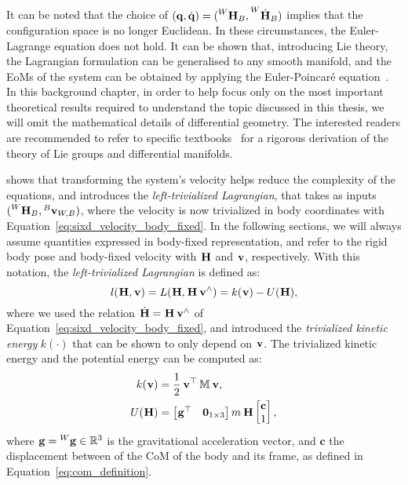 \begin{remark*}
%
It can be noted that the choice of $(\Qu, \Qud) = (\homo[W]_B, \homod[W]_B)$ implies that the configuration space is no longer Euclidean.
In these circumstances, the Euler-Lagrange equation does not hold.
It can be shown that, introducing Lie theory, the Lagrangian formulation can be generalised to any smooth manifold, and the \acp{EoM} of the system can be obtained by applying the Euler-Poincaré equation~\parencite{marsden_jerrold_e_introduction_2010, maruskin_dynamical_2018}.
In this background chapter, in order to help focus only on the most important theoretical results required to understand the topic discussed in this thesis, we will omit the mathematical details of differential geometry.
The interested readers are recommended to refer to specific textbooks~\parencite{warner_foundations_1983, selig_geometric_2005} for a rigorous derivation of the theory of Lie groups and differential manifolds.
%
\end{remark*}
%
\textcite{traversaro_modelling_2017} shows that transforming the system's velocity helps reduce the complexity of the equations, and introduces the \emph{left-trivialized Lagrangian}, that takes as inputs $(\homo[W]_B, \velsix[B]_{W,B})$, where the velocity is now trivialized in body coordinates with Equation~\eqref{eq:sixd_velocity_body_fixed}.
In the following sections, we will always assume quantities expressed in body-fixed representation, and refer to the rigid body pose and body-fixed velocity with $\homo$ and $\velsix$, respectively.
With this notation, the \emph{left-trivialized Lagrangian} is defined as:
%
\begin{equation}
    \label{eq:left_trivialized_lagrangian}
    l(\homo, \velsix) = L(\homo, \homo \velsix^\wedge) = k(\velsix) - U(\homo)
    ,
\end{equation}
%
where we used the relation $\homod = \homo \velsix^\wedge$ of Equation~\eqref{eq:sixd_velocity_body_fixed}, and introduced the \emph{trivialized kinetic energy} $k(\cdot)$ that can be shown to only depend on $\velsix$.
The trivialized kinetic energy and the potential energy can be computed as:
%
\begin{align}
    \label{eq:kinetic_and_potential_energies}
    k(\velsix) &= \frac{1}{2} \velsix^\top \masssix \velsix , \\
    U(\homo) &=
    \begin{bmatrix}\gravity^\top & \zeros_{1\times3}\end{bmatrix}
    m \homo
    \begin{bmatrix}\mathbf{c} \\ 1 \end{bmatrix}
    ,
\end{align}
%
where $\gravity = \gravity[W] \in \realn^3$ is the gravitational acceleration vector, and $\mathbf{c}$ the displacement between of the \ac{CoM} of the body and its frame, as defined in Equation~\eqref{eq:com_definition}.

